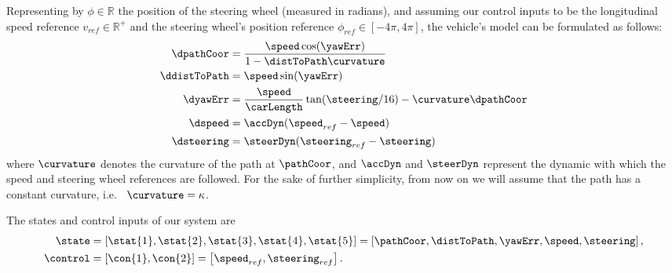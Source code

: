 		Representing by %
		$\phi\in\mathbb{R}$ %
		the position of the steering wheel (measured in radians), and assuming our control inputs to be the longitudinal speed reference %
		$v_{ref}\in\mathbb{R}^+$ %
		and the steering wheel's position reference %
		$\phi_{ref}\in[-4\pi, 4\pi]$, %
		the vehicle's model can be formulated as follows:
		\begin{subequations}
		\begin{align}	
			\dpathCoor 	& = \frac{\speed\cos(\yawErr)}{1-\distToPath\curvature} 
			\label{eq:non_linear_model_1}\\
			\ddistToPath& = \speed\sin(\yawErr) 
			\label{eq:non_linear_model_2}\\
			\dyawErr    & = \frac{\speed}{\carLength}\tan(\steering/16 ) - \curvature\dpathCoor 
			\label{eq:non_linear_model_3}\\
			\dspeed & = \accDyn(\speed_{ref}-\speed) 
			\label{eq:non_linear_model_4}\\
			\dsteering & = \steerDyn(\steering_{ref}-\steering) 
			\label{eq:non_linear_model_5}
		\end{align}
		\end{subequations}
		where %
		$\curvature$ %
		denotes the curvature of the path at %
		$\pathCoor$, %
		and %
		$\accDyn$ %
		and %
		$\steerDyn$ %
		represent the dynamic with which the speed and steering wheel references are followed.
		For the sake of further simplicity, from now on we will assume that the path has a constant curvature, i.e.\ %
		$\curvature = \kappa$. 
		\par
		The states and control inputs of our system are
		\begin{align}
			\mathbf{\state} & = 
				\left[ \stat{1},\stat{2},\stat{3},\stat{4},\stat{5}\right] = %
				\left[\pathCoor, \distToPath, \yawErr, \speed, \steering\right] \label{eq:stateVector}, \\ 
			\mathbf{\control} & = 
				\left[ \con{1},\con{2} \right] = %
				\left[ \speed_{ref}, \steering_{ref} \right].
		\end{align}
